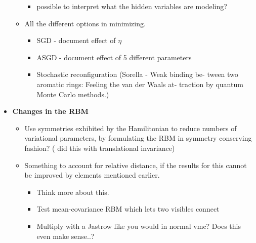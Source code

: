 \documentclass[norsk,a4paper,11pt]{article}
\begin{document}
\begin{itemize}
\begin{itemize}
		\begin{itemize}
			\item possible to interpret what the hidden variables are modeling?
		\end{itemize}
		\item All the different options in minimizing.
		\begin{itemize}
			\item SGD - document effect of $\eta$
			\item ASGD - document effect of 5 different parameters
			\item Stochastic reconfiguration (Sorella - Weak binding be- tween two aromatic rings: Feeling the van der Waals at- traction by quantum Monte Carlo methods.)
		\end{itemize}
	\end{itemize}
	\item \textbf{Changes in the RBM}
	\begin{itemize}
		\item Use symmetries exhibited by the Hamilitonian to reduce numbers of variational parameters, by formulating the RBM in symmetry conserving fashion? (\cite{solveQMann} did this with translational invariance)
		\item Something to account for relative distance, if the results for this cannot be improved by elements mentioned earlier.
		\begin{itemize}
			\item Think more about this.
			\item Test mean-covariance RBM which lets two visibles connect
			\item Multiply with a Jastrow like you would in normal vmc? Does this even make sense..?
		\end{itemize}


\end{itemize}
\end{itemize}
\end{document}
